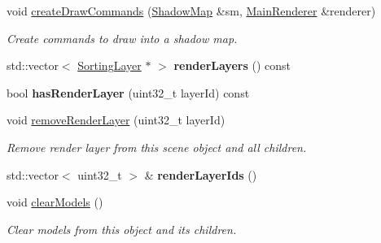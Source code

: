 \begin{Indent}
\begin{DoxyCompactItemize}
void \mbox{\hyperlink{classrev_1_1_scene_object_a2c9faa6b2b128f004bdc4e5c2e4df16d}{create\+Draw\+Commands}} (\mbox{\hyperlink{classrev_1_1_shadow_map}{Shadow\+Map}} \&sm, \mbox{\hyperlink{classrev_1_1_main_renderer}{Main\+Renderer}} \&renderer)
\begin{DoxyCompactList}\small\item\em Create commands to draw into a shadow map. \end{DoxyCompactList}\item 
\mbox{\label{classrev_1_1_scene_object_a866e13c52daaa4ee7c986df6fe41b1cf}} 
std\+::vector$<$ \mbox{\hyperlink{structrev_1_1_sorting_layer}{Sorting\+Layer}} $\ast$ $>$ {\bfseries render\+Layers} () const
\item 
\mbox{\label{classrev_1_1_scene_object_a9d0b3d6631d332e764bcac65f6bb1e58}} 
bool {\bfseries has\+Render\+Layer} (uint32\+\_\+t layer\+Id) const
\item 
\mbox{\label{classrev_1_1_scene_object_adc3a3141887d2b0f9389163c129ac6de}} 
void \mbox{\hyperlink{classrev_1_1_scene_object_adc3a3141887d2b0f9389163c129ac6de}{remove\+Render\+Layer}} (uint32\+\_\+t layer\+Id)
\begin{DoxyCompactList}\small\item\em Remove render layer from this scene object and all children. \end{DoxyCompactList}\item 
\mbox{\label{classrev_1_1_scene_object_a04dda3725cbda5fa059491b196ef8d87}} 
std\+::vector$<$ uint32\+\_\+t $>$ \& {\bfseries render\+Layer\+Ids} ()
\item 
\mbox{\label{classrev_1_1_scene_object_acce0a2894ac93d525919778d40d3b2fd}} 
void \mbox{\hyperlink{classrev_1_1_scene_object_acce0a2894ac93d525919778d40d3b2fd}{clear\+Models}} ()
\begin{DoxyCompactList}\small\item\em Clear models from this object and its children. \end{DoxyCompactList}\item 
\mbox{\label{classrev_1_1_scene_object_a77bde553707421d790814c7f9f0f55fc}} 

\end{DoxyCompactItemize}
\end{Indent}
